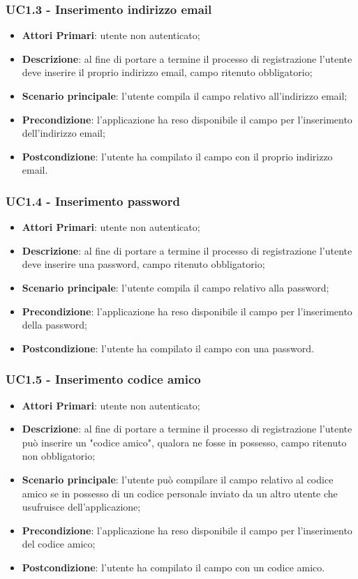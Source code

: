 \subsubsection{UC1.3 - Inserimento indirizzo email}
\begin{itemize}
	\item \textbf{Attori Primari}: utente non autenticato;
	\item \textbf{Descrizione}: al fine di portare a termine il processo di registrazione l'utente deve inserire il proprio indirizzo email, campo ritenuto obbligatorio;
	\item \textbf{Scenario principale}: l'utente compila il campo relativo all'indirizzo email;	
	\item \textbf{Precondizione}: l'applicazione ha reso disponibile il campo per l'inserimento dell'indirizzo email;
	\item \textbf{Postcondizione}: l'utente ha compilato il campo con il proprio indirizzo email.
\end{itemize}
\subsubsection{UC1.4 - Inserimento password}
\begin{itemize}
	\item \textbf{Attori Primari}: utente non autenticato;
	\item \textbf{Descrizione}: al fine di portare a termine il processo di registrazione l'utente deve inserire una password, campo ritenuto obbligatorio;
	\item \textbf{Scenario principale}: l'utente compila il campo relativo alla password;	
	\item \textbf{Precondizione}: l'applicazione ha reso disponibile il campo per l'inserimento della password;
	\item \textbf{Postcondizione}: l'utente ha compilato il campo con una password.
\end{itemize}
\subsubsection{UC1.5 - Inserimento codice amico}
\begin{itemize}
	\item \textbf{Attori Primari}: utente non autenticato;
	\item \textbf{Descrizione}: al fine di portare a termine il processo di registrazione l'utente può inserire un "codice amico", qualora ne fosse in possesso, campo ritenuto non obbligatorio;
	\item \textbf{Scenario principale}: l'utente può compilare il campo relativo al codice amico se in possesso di un codice personale inviato da un altro utente che usufruisce dell'applicazione;	
	\item \textbf{Precondizione}: l'applicazione ha reso disponibile il campo per l'inserimento del codice amico;
	\item \textbf{Postcondizione}: l'utente ha compilato il campo con un codice amico.
\end{itemize}
